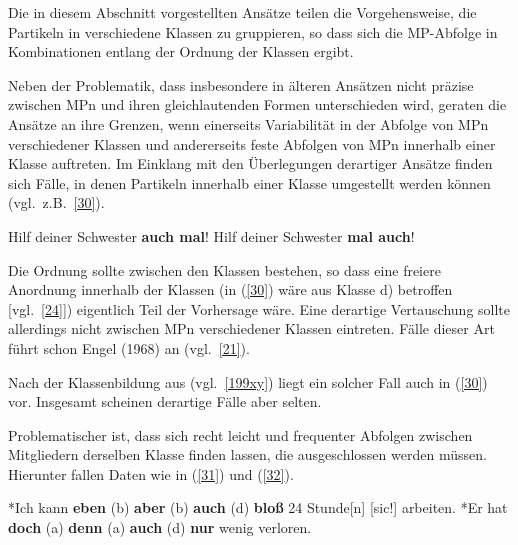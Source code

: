 \noindent
Die in diesem Abschnitt vorgestellten Ansätze teilen die Vorgehensweise, die Partikeln in verschiedene Klassen zu gruppieren, so dass sich die MP-Abfolge in Kombinationen entlang der Ordnung der Klassen ergibt.

Neben der Problematik, dass insbesondere in älteren Ansätzen nicht präzise zwischen MPn und ihren gleichlautenden Formen unterschieden wird, geraten die Ansätze an ihre Grenzen, wenn einerseits Variabilität in der Abfolge von MPn verschiedener Klassen und andererseits feste Abfolgen von MPn innerhalb einer Klasse auftreten. Im Einklang mit den Überlegungen derartiger Ansätze finden sich Fälle, in denen Partikeln innerhalb einer Klasse umgestellt werden können (vgl.\ z.B.\ \ref{30}). 

\begin{exe}
	\ex\label{30} 
		\begin{xlist}	
			\ex\label{30a} Hilf deiner Schwester \textbf{auch mal}!
			\ex\label{30b} Hilf deiner Schwester \textbf{mal auch}!	
			\hfill\hbox{\citet[42]{Helbig1981}}
		\end{xlist}
\end{exe}
Die Ordnung sollte zwischen den Klassen bestehen, so dass eine freiere Anordnung innerhalb der Klassen (in (\ref{30}) wäre aus \citealt{Helbig1981} Klasse d) betroffen [vgl.\ \ref{24}]) eigentlich Teil der Vorhersage wäre. Eine derartige Vertauschung sollte allerdings nicht zwischen MPn verschiedener Klassen eintreten. Fälle dieser Art führt schon Engel (1968) an (vgl.\ \ref{21}).

Nach der Klassenbildung aus \citet{Thurmair1991} (vgl.\ \ref{199xy}) liegt ein solcher Fall auch in (\ref{30}) vor. Insgesamt scheinen derartige Fälle aber selten.

Problematischer ist, dass sich recht leicht und frequenter Abfolgen zwischen Mitgliedern derselben Klasse finden lassen, die ausgeschlossen werden müssen. Hierunter fallen Daten wie in (\ref{31}) und (\ref{32}).\largerpage

\begin{exe}
	\ex\label{31} 
		\begin{xlist}	
			\ex\label{31a} *Ich kann \textbf{eben} (b) \textbf{aber} (b) \textbf{auch} (d) \textbf{bloß} 24 Stunde[n] [sic!] arbeiten.
			\ex\label{31b} *Er hat \textbf{doch} (a) \textbf{denn} (a) \textbf{auch} (d) \textbf{nur} wenig verloren.
		\end{xlist}
\end{exe}
	
